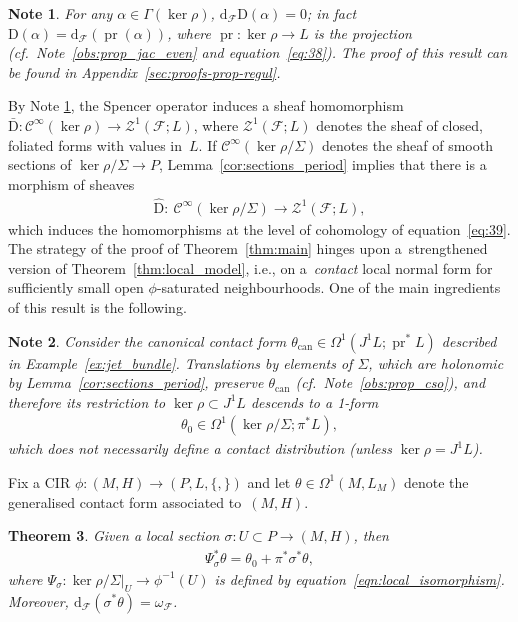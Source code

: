 \documentclass[pdftex]{sigma}
\numberwithin{equation}{section}
\newtheorem{Theorem}{Theorem}[section]
\newtheorem{Note}[Theorem]{Note}
\newcommand{\pr}{\operatorname{pr}}
\newcommand{\de}{\mathrm{d}} %
\newcommand{\CM}{(M,H)} %
\begin{document}
\begin{Note}\label{obs:sod}
For any $\alpha \in \Gamma(\ker \rho)$, $\de_{\mathcal{F}}\mathrm{D}(\alpha) = 0$; in fact $\mathrm{D}(\alpha) = \de_{\mathcal{F}}(\pr(\alpha))$, where $\pr \colon \ker \rho \to L$ is the projection (cf.\ Note~\ref{obs:prop_jac_even} and equation~\eqref{eq:38}). The proof of this result can be found in Appendix~\ref{sec:proofs-prop-regul}.
\end{Note}

By Note \ref{obs:sod}, the Spencer operator induces a sheaf homomorphism $\bar{\mathrm{D}} \colon \mathcal{C}^{\infty}(\ker \rho) \to \mathcal{Z}^1(\mathcal{F};L)$, where $\mathcal{Z}^1(\mathcal{F};L)$ denotes the sheaf of closed, foliated forms with values in~$L$. If $\mathcal{C}^{\infty}(\ker \rho/\Sigma)$ denotes the sheaf of smooth sections of $\ker \rho/\Sigma \to P$, Lemma~\ref{cor:sections_period} implies that
there is a morphism of sheaves
\begin{gather} \label{eq:20}
 \hat{\mathrm{D}} \colon \ \mathcal{C}^{\infty}(\ker \rho/\Sigma) \to \mathcal{Z}^{1}(\mathcal{F};L),
\end{gather}
which induces the homomorphisms at the level of cohomology of equation~\eqref{eq:39}. The strategy of the proof of Theorem~\ref{thm:main} hinges upon a~strengthened version of Theorem~\ref{thm:local_model}, i.e., on a~{\em contact} local normal form for suf\/f\/iciently small open $\phi$-saturated neighbourhoods. One of the main ingredients of this result is the following.

\begin{Note}\label{obs:contact form} Consider the canonical contact form $\theta_{\mathrm{can}}\in \Omega^1(J^1 L; \pr^* L)$ described in Example~\ref{ex:jet_bundle}. Translations by elements of $\Sigma$, which are holonomic by Lemma~\ref{cor:sections_period}, preserve $\theta_{\mathrm{can}}$ (cf.\ Note~\ref{obs:prop_cso}), and therefore its restriction to $\ker\rho\subset J^1L$ descends to a 1-form
 \begin{gather*}
 \theta_0\in \Omega^1(\ker\rho/\Sigma;\pi^*L),
 \end{gather*}
which does not necessarily def\/ine a contact distribution (unless $\ker\rho=J^1 L$).
\end{Note}

Fix a CIR $\phi\colon \CM \to (P,L,\{,\})$ and let $\theta \in \Omega^1(M,L_M)$ denote the generalised contact form associated to~$\CM$.

\begin{Theorem}\label{thm:aa} Given a local section $\sigma\colon U\subset P\to \CM$, then
 \begin{gather*}
 \Psi_\sigma^*\theta=\theta_0+\pi^*\sigma^*\theta,
 \end{gather*}
where $\Psi_\sigma\colon \ker \rho/\Sigma|_U\to \phi^{-1}(U)$ is defined by equation~\eqref{eqn:local_isomorphism}. Moreover, $\de_{\mathcal{F}} (\sigma^*\theta ) = \omega_{\mathcal{F}}$.
\end{Theorem}
\end{document}

